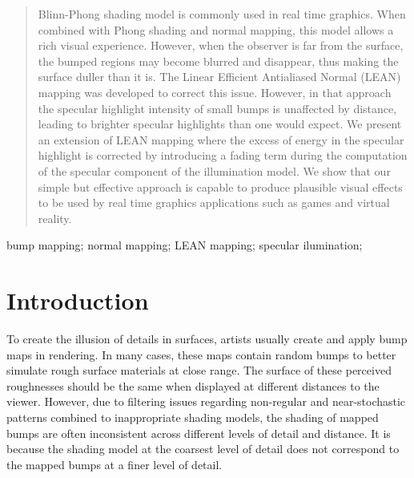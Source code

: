 \documentclass[10pt, conference]{IEEEtran}
\begin{document}
\begin{abstract}
Blinn-Phong shading model is commonly used in real time graphics. When combined with Phong shading and normal mapping, this model allows a rich visual experience. However, when the observer is far from the surface, the bumped regions may become blurred and disappear, thus making the surface duller than it is. The Linear Efficient Antialiased Normal (LEAN) mapping was developed to correct this issue. However, in that approach the specular highlight intensity of small bumps is unaffected by distance, leading to brighter specular highlights than one would expect. We present an extension of LEAN mapping where the excess of energy in the specular highlight is corrected by introducing a fading term during the computation of the specular component of the illumination model. We show that our simple but effective approach is capable to produce plausible visual effects to be used by real time graphics applications such as games and virtual reality.

%
\end{abstract}

\begin{IEEEkeywords}
bump mapping; normal mapping; LEAN mapping; specular ilumination;

\end{IEEEkeywords}


\IEEEpeerreviewmaketitle





\section{Introduction}
%
To create the illusion of details in surfaces, artists usually create and apply bump maps in rendering. In many cases, these maps contain random bumps to better simulate rough surface materials at close range. The surface of these perceived roughnesses should be the same when displayed at different distances to the viewer. However, due to filtering issues regarding non-regular and near-stochastic patterns combined to inappropriate shading models, the shading of mapped bumps are often inconsistent across different levels of detail and distance. It is because the shading model at the coarsest level of detail does not correspond to the mapped bumps at a finer level of detail.
\end{document}
